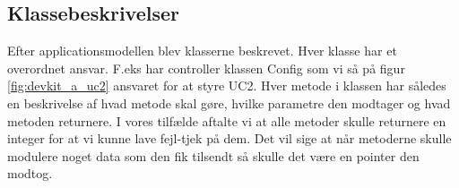 \subsection{Klassebeskrivelser}

Efter applicationsmodellen blev klasserne beskrevet. Hver klasse har et overordnet ansvar. F.eks har controller klassen Config som vi så på figur \ref{fig:devkit_a_uc2} ansvaret for at styre UC2. Hver metode i klassen har således en beskrivelse af hvad metode skal gøre, hvilke parametre den modtager og hvad metoden returnere. I vores tilfælde aftalte vi at alle metoder skulle returnere en integer for at vi kunne lave fejl-tjek på dem. Det vil sige at når metoderne skulle modulere noget data som den fik tilsendt så skulle det være en pointer den modtog.


